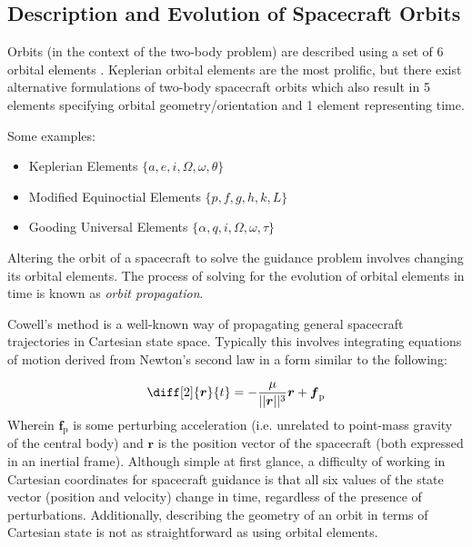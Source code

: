 \subsection{Description and Evolution of Spacecraft Orbits}

Orbits (in the context of the two-body problem) are described using a set of 6 orbital elements \cite{book:1487513}. Keplerian orbital elements are the most prolific, but there exist alternative formulations of two-body spacecraft orbits which also result in 5 elements specifying orbital geometry/orientation and 1 element representing time.

Some examples:
\begin{itemize}
    \item Keplerian Elements $\{a, e, i, \Omega, \omega, \theta\}$
    \item Modified Equinoctial Elements $\{p, f, g, h, k, L\}$ \cite{walker1985set}
    \item Gooding Universal Elements  $\{\alpha, q, i, \Omega, \omega, \tau\}$ \cite{gooding_universal_elements}
\end{itemize}

Altering the orbit of a spacecraft to solve the guidance problem involves changing its orbital elements. The process of solving for the evolution of orbital elements in time is known as \textit{orbit propagation}.

Cowell's method \cite{book:1487513} is a well-known way of propagating general spacecraft trajectories in Cartesian state space. Typically this involves integrating equations of motion derived from Newton's second law in a form similar to the following:

\begin{equation}
    \diff[2]{{\boldsymbol{r}}}{t} = -\frac{\mu}{||\boldsymbol{r}||^3} \boldsymbol{r} + \boldsymbol{f}_\mathrm{p} \label{eq:cowells_method}
\end{equation}
Wherein $\boldsymbol{f}_\mathrm{p}$ is some perturbing acceleration (i.e. unrelated to point-mass gravity of the central body) and $\boldsymbol{r}$ is the position vector of the spacecraft (both expressed in an inertial frame). Although simple at first glance, a difficulty of working in Cartesian coordinates for spacecraft guidance is that all six values of the state vector (position and velocity) change in time, regardless of the presence of perturbations. Additionally, describing the geometry of an orbit in terms of Cartesian state is not as straightforward as using orbital elements.


